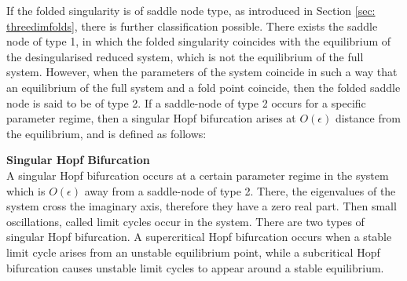 If the folded singularity is of saddle node type, as introduced in Section \ref{sec: threedimfolds}, there is further classification possible.
There exists the saddle node of type 1, in which the folded singularity coincides with the equilibrium of the desingularised reduced system, which is not the equilibrium of the full system. However, when the parameters of the system coincide in such a way that an equilibrium of the full system and a fold point coincide, then the folded saddle node is said to be of type 2. If a saddle-node of  type 2 occurs for a specific parameter regime, then a singular Hopf bifurcation arises at $O(\epsilon)$ distance from the equilibrium, and is defined as follows:
\begin{definition}{\textbf{Singular Hopf Bifurcation} \citet{strogatz2007nonlinear}}\\
A singular Hopf bifurcation occurs at a certain parameter regime in the system which is $O(\epsilon)$ away from a saddle-node of type 2. There, the eigenvalues of the system cross the imaginary axis, therefore they have a zero real part. Then small oscillations, called limit cycles occur in the system. There are two types of singular Hopf bifurcation. A supercritical Hopf bifurcation occurs when a stable limit cycle arises from an unstable equilibrium point, while a subcritical Hopf bifurcation causes unstable limit cycles to appear around a stable equilibrium.
\end{definition}

